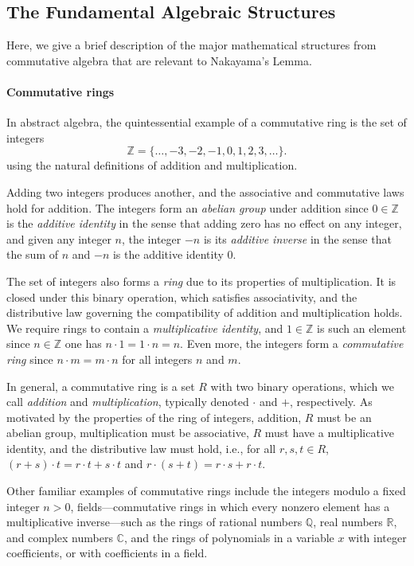 \documentclass[referee,sn-mathphys]{sn-jnl}
\theoremstyle{definition}
\theoremstyle{remark}
\numberwithin{equation}{section}
\numberwithin{figure}{subsection}
\begin{document}
\subsection{The Fundamental Algebraic Structures}
Here, we give a brief description of the major mathematical structures from
commutative algebra that are relevant to Nakayama's Lemma.

\paragraph{Commutative rings}
In abstract algebra, the quintessential example of a commutative ring is the
set of integers
\[\mathbb{Z} = \{ \ldots, -3, -2, -1, 0, 1, 2, 3, \ldots \}.\]
using the natural definitions of addition and multiplication.

Adding two integers produces another, and the associative and commutative laws
hold for addition. The integers form an \emph{abelian group} under addition
since $0 \in \mathbb{Z}$ is the \emph{additive identity} in the sense that
adding zero has no effect on any integer, and given any integer $n$, the
integer $-n$ is its \emph{additive inverse} in the sense that the sum of $n$
and $-n$ is the additive identity $0$. 

The set of integers also forms a \emph{ring} due to its properties of
multiplication. It is closed under this binary operation, which satisfies
associativity, and the distributive law governing the compatibility of addition
and multiplication holds.  We require rings to contain a \emph{multiplicative
identity}, and $1 \in \mathbb{Z}$ is such an element since $n \in \mathbb{Z}$
one has $n \cdot 1 = 1 \cdot n = n$. Even more, the integers form a
\emph{commutative ring} since $n \cdot m = m \cdot n$ for all integers $n$ and
$m$. 

In general, a commutative ring is a set $R$ with two binary operations, which
we call \emph{addition} and \emph{multiplication}, typically denoted $\cdot$
and $+$, respectively. As motivated by the properties of the ring of integers,
addition, $R$ must be an abelian group, multiplication must be associative, $R$
must have a multiplicative identity, and the distributive law must hold, i.e.,
for all $r, s, t \in R$, $(r+s)\cdot t = r \cdot t + s \cdot t$ and
$r \cdot (s+t) = r \cdot s + r \cdot t$.

Other familiar examples of commutative rings include the integers modulo a
fixed integer $n>0$, fields---commutative rings in which every nonzero element
has a multiplicative inverse---such as the rings of rational numbers $\mathbb{Q}$, real
numbers $\mathbb{R}$, and complex numbers $\mathbb{C}$, and the rings
 of polynomials in a variable $x$ with
integer coefficients, or with coefficients in a field.
\end{document}
